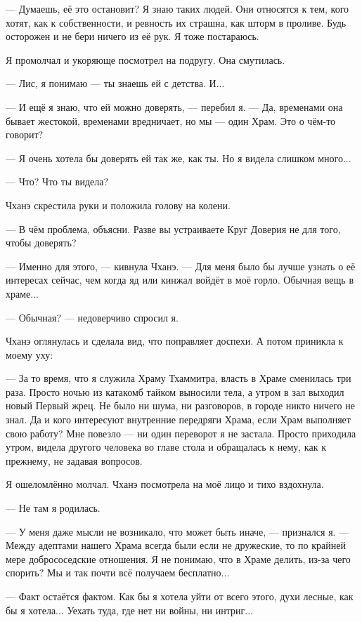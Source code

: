 --- Думаешь, её это остановит?
Я знаю таких людей.
Они относятся к тем, кого хотят, как к собственности, и ревность их страшна, как шторм в проливе.
Будь осторожен и не бери ничего из её рук.
Я тоже постараюсь.

Я промолчал и укоряюще посмотрел на подругу.
Она смутилась.

--- Лис, я понимаю --- ты знаешь ей с детства.
И...

--- И ещё я знаю, что ей можно доверять, --- перебил я.
--- Да, временами она бывает жестокой, временами вредничает, но мы --- один Храм.
Это о чём-то говорит?

--- Я очень хотела бы доверять ей так же, как ты.
Но я видела слишком много...

--- Что?
Что ты видела?

Чханэ скрестила руки и положила голову на колени.

--- В чём проблема, объясни.
Разве вы устраиваете Круг Доверия не для того, чтобы доверять?

--- Именно для этого, --- кивнула Чханэ.
--- Для меня было бы лучше узнать о её интересах сейчас, чем когда яд или кинжал войдёт в моё горло.
Обычная вещь в храме...

--- Обычная? --- недоверчиво спросил я.

Чханэ оглянулась и сделала вид, что поправляет доспехи.
А потом приникла к моему уху:

--- За то время, что я служила Храму Тхаммитра, власть в Храме сменилась три раза.
Просто ночью из катакомб тайком выносили тела, а утром в зал выходил новый Первый жрец.
Не было ни шума, ни разговоров, в городе никто ничего не знал.
Да и кого интересуют внутренние передряги Храма, если Храм выполняет свою работу?
Мне повезло --- ни один переворот я не застала.
Просто приходила утром, видела другого человека во главе стола и обращалась к нему, как к прежнему, не задавая вопросов.

Я ошеломлённо молчал.
Чханэ посмотрела на моё лицо и тихо вздохнула.

--- Не там я родилась.

--- У меня даже мысли не возникало, что может быть иначе, --- признался я.
--- Между адептами нашего Храма всегда были если не дружеские, то по крайней мере добрососедские отношения.
Я не понимаю, что в Храме делить, из-за чего спорить?
Мы и так почти всё получаем бесплатно...

--- Факт остаётся фактом.
Как бы я хотела уйти от всего этого, духи лесные, как бы я хотела...
Уехать туда, где нет ни войны, ни интриг...

